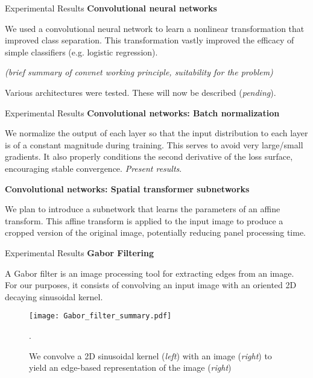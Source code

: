 \documentclass[10pt]{beamer}
\begin{document}
\begin{frame}{Experimental Results}
	\textbf{Convolutional neural networks}

	We used a convolutional neural network to learn a nonlinear transformation that improved class separation. This transformation vastly improved the efficacy of simple classifiers (e.g. logistic regression).
	
	\emph{(brief summary of convnet working principle, suitability for the problem)}
	
	Various architectures were tested. These will now be described (\emph{pending}).
\end{frame}

\begin{frame}{Experimental Results}
\textbf{Convolutional networks: Batch normalization}

We normalize the output of each layer so that the input distribution to each layer is of a constant magnitude during training. This serves to avoid very large/small gradients. It also properly conditions the second derivative of the loss surface, encouraging stable convergence. \emph{Present results}.

\textbf{Convolutional networks: Spatial transformer subnetworks}

We plan to introduce a subnetwork that learns the parameters of an affine transform. This affine transform is applied to the input image to produce a cropped version of the original image, potentially reducing panel processing time.

\end{frame}


\begin{frame}{Experimental Results}
\textbf{Gabor Filtering}

A Gabor filter is an image processing tool for extracting edges from an image. For our purposes, it consists of convolving an input image with an oriented 2D decaying sinusoidal kernel.

	\begin{figure}
		\texttt{[image: Gabor\_filter\_summary.pdf]}
		\caption{We convolve a 2D sinusoidal kernel (\emph{left}) with an image (\emph{right}) to yield an edge-based representation of the image (\emph{right})}. 
	\end{figure}	

\end{frame}
\end{document}
